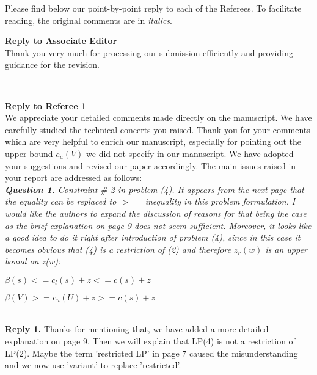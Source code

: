 \documentclass[11pt]{article}
\begin{document}
Please find below our point-by-point reply to each of the Referees. To facilitate reading, the original comments are in {\it italics}.



\newpage

\noindent \textbf{\large Reply to Associate Editor}
\\[3mm]
Thank you very much for processing our submission efficiently and providing guidance for the revision.

\\[4mm]


\newpage

\noindent \textbf{\large Reply to Referee 1}
\\[3mm]
We appreciate your detailed comments made directly on the manuscript.
We have carefully studied the technical concerts you raised.
Thank you for your comments which are very helpful to enrich our manuscript, especially for pointing out the upper bound $c_u(V)$ we did not specify in our manuscript. We have adopted your suggestions and revised our paper accordingly. The main issues raised in your report are addressed as follows:
\\[4mm]
%
%
\noindent \textit{\textbf{Question 1.}
Constraint \# 2 in problem (4). It appears from the next page that the equality can be replaced to $>=$ inequality in this problem formulation. I would like the authors to expand the discussion of reasons for that being the case as the brief explanation on page 9 does not seem sufficient. Moreover, it looks like a good idea to do it right after introduction of problem (4), since in this case it becomes obvious that (4) is a restriction of (2) and therefore $z_r(w)$ is an upper bound on z(w):}

$\beta(s) <= c_l(s) + z <= c(s) + z$

$\beta(V) >= c_u(U) + z >= c(s) + z$

\\[2mm]
\noindent \textbf{Reply 1.}
Thanks for mentioning that, we have added a more detailed explanation on page 9.
Then we will explain that LP(4) is not a restriction of LP(2). Maybe the term 'restricted LP' in page 7 caused the misunderstanding and we now use 'variant' to replace 'restricted'.
\end{document}
